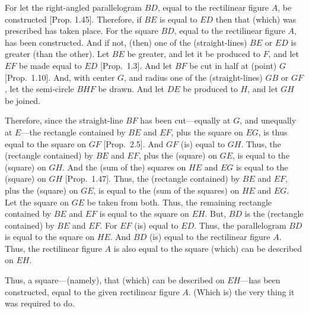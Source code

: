 \begin{Parallel}{}{}
{\epsfysize=2in
\centerline{}

For let the right-angled parallelogram $BD$,  equal to
the rectilinear figure $A$, be constructed  [Prop. 1.45]. Therefore, if $BE$ is equal to $ED$ then
that (which) was prescribed has taken place. For the square $BD$, equal to the rectilinear figure $A$,
has been constructed. And if not, (then)
one of the (straight-lines) $BE$ or $ED$ is greater (than the other). Let $BE$ be greater, and let it be
produced to $F$, and let $EF$ be made equal to $ED$ [Prop.~1.3].
And let $BF$ be cut in half at (point) $G$ [Prop.~1.10]. And, with center $G$, and
radius one of the (straight-lines) $GB$ or $GF$, let the semi-circle $BHF$ be drawn.
And let $DE$ be produced to $H$, and let $GH$ be joined.

Therefore, since the straight-line $BF$ has been cut---equally at $G$,
and unequally at $E$---the rectangle contained by $BE$ and $EF$, plus the
square on $EG$, is thus equal to the square on $GF$ [Prop.~2.5]. And $GF$ (is)
equal to $GH$. Thus, the (rectangle contained) by $BE$ and $EF$, plus the
(square) on $GE$, is equal to the (square) on $GH$. And the (sum of the) squares on $HE$ and $EG$  is equal to the (square)
on $GH$  [Prop.~1.47].
Thus, the (rectangle contained) by $BE$ and $EF$, plus the (square) on $GE$, is
equal to the (sum of the squares) on $HE$ and $EG$.
Let the square on $GE$ be taken from both. Thus, the remaining
rectangle contained by $BE$ and $EF$ is equal to the square
on $EH$. But, $BD$ is the (rectangle contained) by $BE$ and $EF$. For $EF$ (is)
equal to $ED$. Thus, the parallelogram $BD$ is equal to the square on $HE$.
And $BD$ (is) equal to the rectilinear figure $A$. Thus, the rectilinear figure
$A$ is also equal to the square (which) can be described on $EH$.

Thus, a 
square---(namely), that (which) can be described on $EH$---has been constructed, equal
to the given rectilinear figure $A$. (Which is) the very thing it was required to do.}
\end{Parallel}
